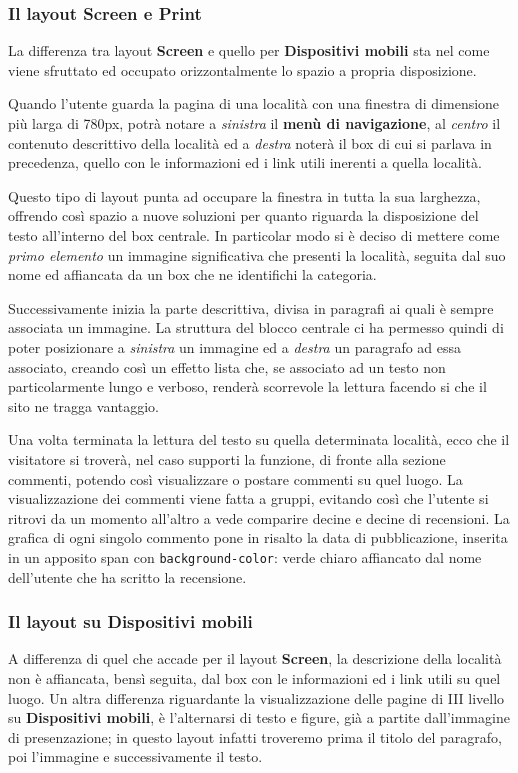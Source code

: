 \subsubsection{Il layout Screen e Print}\label{sec:Pres-IIIliv-Screen}
La differenza tra layout \textbf{Screen} e quello per \textbf{Dispositivi
mobili} sta nel come viene sfruttato ed occupato orizzontalmente lo spazio a
propria disposizione.

Quando l'utente guarda la pagina di una località con una finestra di
dimensione più larga di 780px, potrà notare a \textit{sinistra} il
\textbf{menù di navigazione}, al \textit{centro} il contenuto descrittivo
della località ed a \textit{destra} noterà il box di cui si parlava in
precedenza, quello con le informazioni ed i link utili inerenti a quella
località.

Questo tipo di layout punta ad occupare la finestra in tutta la sua larghezza,
offrendo così spazio a nuove soluzioni per quanto riguarda la disposizione del
testo all'interno del box centrale. In particolar modo si è deciso di mettere
come \textit{primo elemento} un immagine significativa che presenti la
località, seguita dal suo nome ed affiancata da un box che ne identifichi la
categoria.

Successivamente inizia la parte descrittiva, divisa in paragrafi ai quali è
sempre associata un immagine. La struttura del blocco centrale ci ha permesso
quindi di poter posizionare a \textit{sinistra} un immagine ed a
\textit{destra} un paragrafo ad essa associato, creando così un effetto lista
che, se associato ad un testo non particolarmente lungo e verboso, renderà
scorrevole la lettura facendo si che il sito ne tragga vantaggio.

Una volta terminata la lettura del testo su quella determinata località, ecco
che il visitatore si troverà, nel caso supporti la funzione, di fronte alla
sezione commenti, potendo così visualizzare o postare commenti su quel luogo.
La visualizzazione dei commenti viene fatta a gruppi, evitando così che
l'utente si ritrovi da un momento all'altro a vede comparire decine e decine
di recensioni. La grafica di ogni singolo commento pone in risalto la data di
pubblicazione, inserita in un apposito span con \texttt{background-color}:
verde chiaro affiancato dal nome dell'utente che ha scritto la recensione.

\subsubsection{Il layout su Dispositivi mobili}\label{sec:Pres-IIIliv-Mobile}
A differenza di quel che accade per il layout \textbf{Screen}, la descrizione
della località non è affiancata, bensì seguita, dal box con le informazioni ed
i link utili su quel luogo. Un altra differenza riguardante la visualizzazione
delle pagine di III livello su \textbf{Dispositivi mobili}, è l'alternarsi di
testo e figure, già a partite dall'immagine di presenzazione; in questo layout
infatti troveremo prima il titolo del paragrafo, poi l'immagine e
successivamente il testo.

